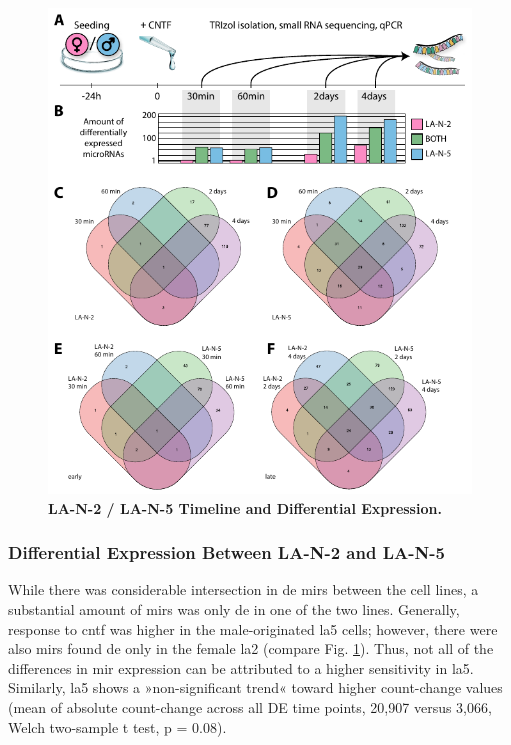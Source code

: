 \begin{figure} 
\includegraphics[width=\textwidth]{figures/timepoints-expr-venn}
\caption[Timeline Differential Expression.]{\textbf{LA-N-2 / LA-N-5 Timeline and Differential Expression.}
\label{fig:timepoints-expr-venn}}
\end{figure}

\subsubsection{Differential Expression Between LA-N-2 and LA-N-5}
While there was considerable intersection in \ac{de} \acp{mir} between the cell lines, a substantial amount of \acp{mir} was only \ac{de} in one of the two lines. Generally, response to \ac{cntf} was higher in the male-originated \ac{la5} cells; however, there were also \acp{mir} found \ac{de} only in the female \ac{la2} (compare Fig. \ref{fig:timepoints-expr-venn}). Thus, not all of the differences in \ac{mir} expression can be attributed to a higher sensitivity in \ac{la5}. Similarly, \ac{la5} shows a »non-significant trend« toward higher count-change values (mean of absolute count-change across all DE time points, 20,907 versus 3,066, Welch two-sample t test, p = 0.08).


